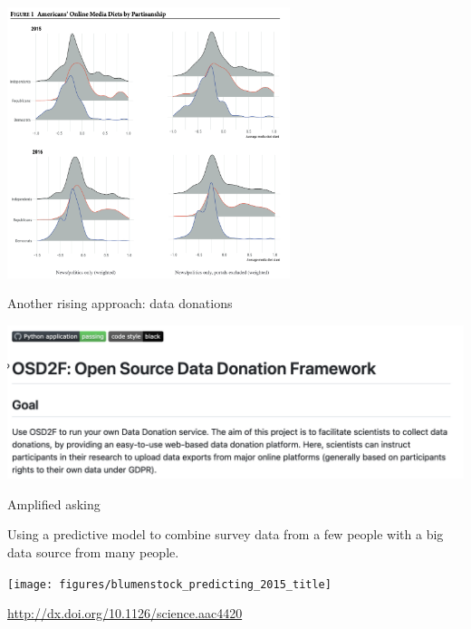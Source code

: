 \documentclass[aspectratio=169]{beamer}
\begin{document}
\begin{frame}

\begin{center}
\includegraphics[width=0.62\textwidth]{figures/guess2021-figure1.png}
\end{center}

\end{frame}
\begin{frame}

Another rising approach: data donations

\begin{center}
\includegraphics[width=\textwidth]{figures/osd2f.png}
\end{center}

\end{frame}
\begin{frame}

\begin{center}
\LARGE{Amplified asking} \\
\end{center}
Using a predictive model to combine survey data from a few people with a big data source from many people. 

\end{frame}
\begin{frame}

\begin{center}
\texttt{[image: figures/blumenstock\_predicting\_2015\_title]}
\end{center}

\vfill
\tiny{\url{http://dx.doi.org/10.1126/science.aac4420}}
\end{frame}
\end{document}
